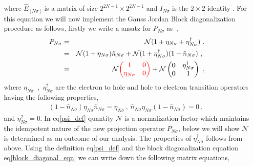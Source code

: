 \documentclass[12pt,a4paper]{article}
\begin{document}
where $\hat{E}_{[N\sigma]}$ is a matrix of size $2^{2N-1}\times 2^{2N-1}$ and $I_{N\sigma}$ is the $2\times 2$ identity . For this equation we will now implement the Gauss Jordan Block diagonalization procedure as follows, firstly we write a ansatz for $P_{N\sigma}$ as~, 
\begin{eqnarray}
P_{N\sigma} &=& \mathcal{N}(1+\eta_{N\sigma}+\eta^{\dagger}_{N\sigma})~,\nonumber\\
&=&\mathcal{N}(1+\eta_{N\sigma})\hat{n}_{N\sigma}+\mathcal{N}(1+\eta^{\dagger}_{N\sigma})(1-\hat{n}_{N\sigma})~,~\nonumber\\
&=&\mathcal{N}\textcolor{red}{\begin{pmatrix}
1 & 0\\
\eta_{N\sigma} & 0
\end{pmatrix}}+\mathcal{N}\begin{pmatrix}
0 & \eta^{\dagger}_{N\sigma}\\
0 & 1
\end{pmatrix}~,\label{psi_def}
\end{eqnarray}
where $\eta_{N\sigma}$~,~$\eta^{\dagger}_{N\sigma}$ are the electron to hole and hole to electron transition operators having the following properties,
\begin{eqnarray}
(1-\hat{n}_{N\sigma})\eta_{N\sigma}\hat{n}_{N\sigma}=\eta_{N\sigma}~,~\hat{n}_{N\sigma}\eta_{N\sigma}(1-\hat{n}_{N\sigma})=0~,~\nonumber
\end{eqnarray}
and $\eta^{2}_{N\sigma}=0$. In eq\eqref{psi_def} quantity $\mathcal{N}$ is a normalization factor which maintains the idempotent nature of the new projection operator $P_{N\sigma}$, below we will show $\mathcal{N}$ is determined as an outcome of our analysis.
The properties of $\eta^{\dagger}_{N\sigma}$ follows from above.
Using the definition eq\eqref{psi_def} and the block diagonalization equation eq\eqref{block_diagonal_eqn} we can write down the following matrix equations,
\end{document}
